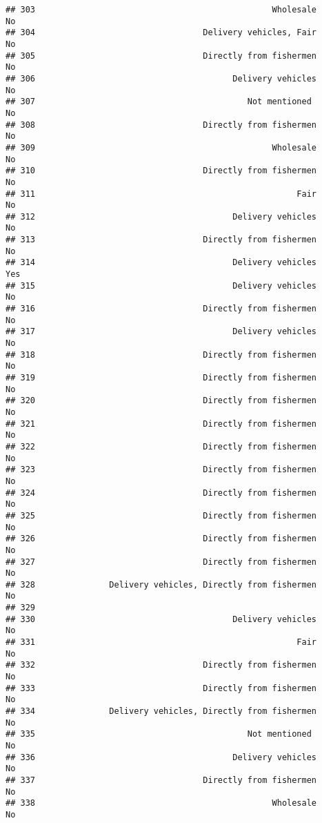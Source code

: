 \documentclass[
]{article}
\begin{document}
\begin{verbatim}
## 303                                                Wholesale        No
## 304                                  Delivery vehicles, Fair        No
## 305                                  Directly from fishermen        No
## 306                                        Delivery vehicles        No
## 307                                           Not mentioned         No
## 308                                  Directly from fishermen        No
## 309                                                Wholesale        No
## 310                                  Directly from fishermen        No
## 311                                                     Fair        No
## 312                                        Delivery vehicles        No
## 313                                  Directly from fishermen        No
## 314                                        Delivery vehicles       Yes
## 315                                        Delivery vehicles        No
## 316                                  Directly from fishermen        No
## 317                                        Delivery vehicles        No
## 318                                  Directly from fishermen        No
## 319                                  Directly from fishermen        No
## 320                                  Directly from fishermen        No
## 321                                  Directly from fishermen        No
## 322                                  Directly from fishermen        No
## 323                                  Directly from fishermen        No
## 324                                  Directly from fishermen        No
## 325                                  Directly from fishermen        No
## 326                                  Directly from fishermen        No
## 327                                  Directly from fishermen        No
## 328               Delivery vehicles, Directly from fishermen        No
## 329                                                                   
## 330                                        Delivery vehicles        No
## 331                                                     Fair        No
## 332                                  Directly from fishermen        No
## 333                                  Directly from fishermen        No
## 334               Delivery vehicles, Directly from fishermen        No
## 335                                           Not mentioned         No
## 336                                        Delivery vehicles        No
## 337                                  Directly from fishermen        No
## 338                                                Wholesale        No

\end{verbatim}
\end{document}
